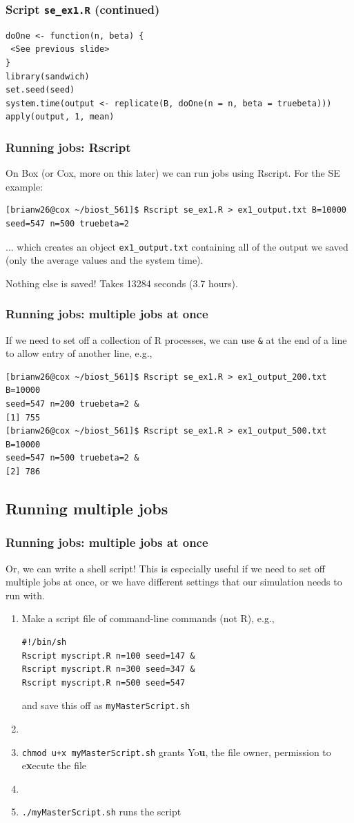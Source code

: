 \documentclass[12pt, 
hyperref={colorlinks=true, linkcolor=blue, urlcolor=cyan}]{beamer}
\begin{document}
\begin{frame}[fragile]
\frametitle{Script \texttt{se\_ex1.R} (continued)}
{\scriptsize
\begin{verbatim}
doOne <- function(n, beta) {
 <See previous slide>
}
library(sandwich)
set.seed(seed)
system.time(output <- replicate(B, doOne(n = n, beta = truebeta)))
apply(output, 1, mean)
\end{verbatim}
}
\end{frame}

\begin{frame}[fragile]
\frametitle{Running jobs: Rscript}
On Box (or Cox, more on this later) we can run jobs using Rscript. For the SE example:
{\scriptsize
\begin{verbatim}
[brianw26@cox ~/biost_561]$ Rscript se_ex1.R > ex1_output.txt B=10000 
seed=547 n=500 truebeta=2
\end{verbatim}}
 ... which creates an object \texttt{ex1\_output.txt} containing all of the output we saved (only the average values and the system time).

Nothing else is saved! Takes 13284 seconds (3.7 hours).
\end{frame}

\begin{frame}[fragile]
\frametitle{Running jobs: multiple jobs at once}
If we need to set off a collection of R processes, we can use \texttt{\&} at the end of a line to allow entry of another line, e.g., 
{\scriptsize
\begin{verbatim}
[brianw26@cox ~/biost_561]$ Rscript se_ex1.R > ex1_output_200.txt B=10000 
seed=547 n=200 truebeta=2 &
[1] 755
[brianw26@cox ~/biost_561]$ Rscript se_ex1.R > ex1_output_500.txt B=10000 
seed=547 n=500 truebeta=2 &
[2] 786
\end{verbatim}
}
\end{frame}

\subsection{Running multiple jobs}
\begin{frame}[fragile]
\frametitle{Running jobs: multiple jobs at once}
Or, we can write a shell script! This is especially useful if we need to set off multiple jobs at once, or we have different settings that our simulation needs to run with. 
\begin{enumerate}
\item Make a script file of command-line commands (not R), e.g., 
\begin{verbatim}
#!/bin/sh
Rscript myscript.R n=100 seed=147 &
Rscript myscript.R n=300 seed=347 &
Rscript myscript.R n=500 seed=547
\end{verbatim}
and save this off as \texttt{myMasterScript.sh}
\item[]
\item \texttt{chmod u+x myMasterScript.sh} grants Yo\textbf{u}, the file owner, permission to e\textbf{x}ecute the file
\item[]
\item \texttt{./myMasterScript.sh} runs the script
\end{enumerate}
\end{frame}
\end{document}
